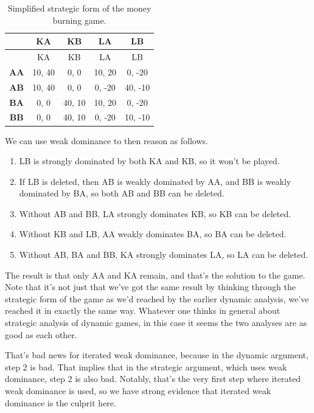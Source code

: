 \documentclass[
  12pt,
  letterpaper,
  DIV=11,
  numbers=noendperiod]{scrreprt}
\providecommand{\tightlist}{%
  \setlength{\itemsep}{0pt}\setlength{\parskip}{0pt}}\usepackage{longtable,booktabs,array}
\begin{document}
\hypertarget{tbl-money-burning}{}
\begin{longtable}[]{@{}ccccc@{}}
\caption{\label{tbl-money-burning}Simplified strategic form of the money
burning game.}\tabularnewline
\toprule\noalign{}
& KA & KB & LA & LB \\
\midrule\noalign{}
\endfirsthead
\toprule\noalign{}
& KA & KB & LA & LB \\
\midrule\noalign{}
\endhead
\bottomrule\noalign{}
\endlastfoot
\textbf{AA} & 10, 40 & 0, 0 & 10, 20 & 0, -20 \\
\textbf{AB} & 10, 40 & 0, 0 & 0, -20 & 40, -10 \\
\textbf{BA} & 0, 0 & 40, 10 & 10, 20 & 0, -20 \\
\textbf{BB} & 0, 0 & 40, 10 & 0, -20 & 10, -10 \\
\end{longtable}

We can use weak dominance to then reason as follows.

\begin{enumerate}
\def\labelenumi{\arabic{enumi}.}
\tightlist
\item
  LB is strongly dominated by both KA and KB, so it won't be played.
\item
  If LB is deleted, then AB is weakly dominated by AA, and BB is weakly
  dominated by BA, so both AB and BB can be deleted.
\item
  Without AB and BB, LA strongly dominates KB, so KB can be deleted.
\item
  Without KB and LB, AA weakly dominates BA, so BA can be deleted.
\item
  Without AB, BA and BB, KA strongly dominates LA, so LA can be deleted.
\end{enumerate}

The result is that only AA and KA remain, and that's the solution to the
game. Note that it's not just that we've got the same result by thinking
through the strategic form of the game as we'd reached by the earlier
dynamic analysis, we've reached it in exactly the same way. Whatever one
thinks in general about strategic analysis of dynamic games, in this
case it seems the two analyses are as good as each other.

That's bad news for iterated weak dominance, because in the dynamic
argument, step 2 is bad. That implies that in the strategic argument,
which uses weak dominance, step 2 is also bad. Notably, that's the very
first step where iterated weak dominance is used, so we have strong
evidence that iterated weak dominance is the culprit here.
\end{document}
